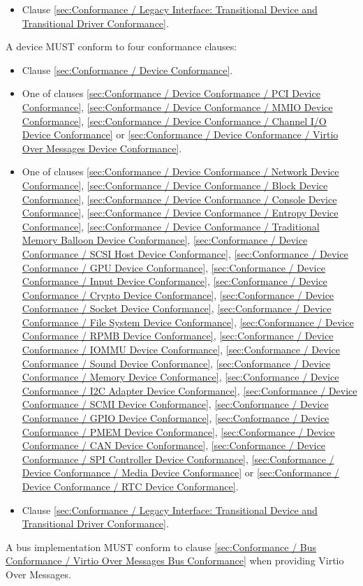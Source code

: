 \begin{description}
\begin{itemize}
    \item Clause \ref{sec:Conformance / Legacy Interface: Transitional Device and Transitional Driver Conformance}.
  \end{itemize}
\item[Device] A device MUST conform to four conformance clauses:
  \begin{itemize}
    \item Clause \ref{sec:Conformance / Device Conformance}.
    \item One of clauses \ref{sec:Conformance / Device Conformance / PCI Device Conformance}, \ref{sec:Conformance / Device Conformance / MMIO Device Conformance}, \ref{sec:Conformance / Device Conformance / Channel I/O Device Conformance} or \ref{sec:Conformance / Device Conformance / Virtio Over Messages Device Conformance}.
    \item One of clauses 
\ref{sec:Conformance / Device Conformance / Network Device Conformance}, 
\ref{sec:Conformance / Device Conformance / Block Device Conformance}, 
\ref{sec:Conformance / Device Conformance / Console Device Conformance}, 
\ref{sec:Conformance / Device Conformance / Entropy Device Conformance}, 
\ref{sec:Conformance / Device Conformance / Traditional Memory Balloon Device Conformance}, 
\ref{sec:Conformance / Device Conformance / SCSI Host Device Conformance}, 
\ref{sec:Conformance / Device Conformance / GPU Device Conformance},
\ref{sec:Conformance / Device Conformance / Input Device Conformance}, 
\ref{sec:Conformance / Device Conformance / Crypto Device Conformance}, 
\ref{sec:Conformance / Device Conformance / Socket Device Conformance}, 
\ref{sec:Conformance / Device Conformance / File System Device Conformance},
\ref{sec:Conformance / Device Conformance / RPMB Device Conformance},
\ref{sec:Conformance / Device Conformance / IOMMU Device Conformance},
\ref{sec:Conformance / Device Conformance / Sound Device Conformance},
\ref{sec:Conformance / Device Conformance / Memory Device Conformance},
\ref{sec:Conformance / Device Conformance / I2C Adapter Device Conformance},
\ref{sec:Conformance / Device Conformance / SCMI Device Conformance},
\ref{sec:Conformance / Device Conformance / GPIO Device Conformance},
\ref{sec:Conformance / Device Conformance / PMEM Device Conformance},
\ref{sec:Conformance / Device Conformance / CAN Device Conformance},
\ref{sec:Conformance / Device Conformance / SPI Controller Device Conformance},
\ref{sec:Conformance / Device Conformance / Media Device Conformance} or
\ref{sec:Conformance / Device Conformance / RTC Device Conformance}.

    \item Clause \ref{sec:Conformance / Legacy Interface: Transitional Device and Transitional Driver Conformance}.
  \end{itemize}
\item[Bus] A bus implementation MUST conform to clause \ref{sec:Conformance / Bus Conformance / Virtio Over Messages Bus Conformance} when providing Virtio Over Messages.
\end{description}

